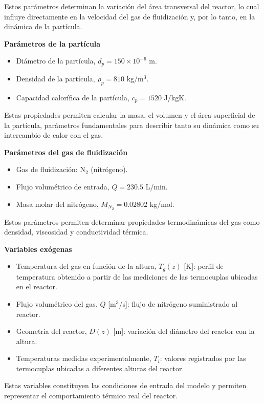 \documentclass[11pt,stdletter,orderfromtodate,sigleft,twoside]{report}
\begin{document}
Estos parámetros determinan la variación del área transversal del reactor, lo cual influye directamente en la velocidad del gas de fluidización y, por lo tanto, en la dinámica de la partícula.
\medskip


\textbf{Parámetros de la partícula}

\begin{itemize}
\item Diámetro de la partícula, $d_p = 150 \times 10^{-6}$ m.
\item Densidad de la partícula, $\rho_p = 810$ kg/m$^3$.
\item Capacidad calorífica de la partícula, $c_p = 1520$ J/kgK.
\end{itemize}

Estas propiedades permiten calcular la masa, el volumen y el área superficial de la partícula, parámetros fundamentales para describir tanto su dinámica como su intercambio de calor con el gas.
\medskip


\textbf{Parámetros del gas de fluidización}

\begin{itemize}
\item Gas de fluidización: N$_2$ (nitrógeno).
\item Flujo volumétrico de entrada, $Q = 230.5$ L/min.
\item Masa molar del nitrógeno, $M_{N_2} = 0.02802$ kg/mol.
\end{itemize}

Estos parámetros permiten determinar propiedades termodinámicas del gas como densidad, viscosidad y conductividad térmica.
\medskip


\textbf{Variables exógenas} 

\begin{itemize}
\item Temperatura del gas en función de la altura, $T_g(z)$ [K]: perfil de temperatura obtenido a partir de las mediciones de las termocuplas ubicadas en el reactor.
\item Flujo volumétrico del gas, $Q$ [m$^3$/s]: flujo de nitrógeno suministrado al reactor.
\item Geometría del reactor, $D(z)$ [m]: variación del diámetro del reactor con la altura.
\item Temperaturas medidas experimentalmente, $T_i$: valores registrados por las termocuplas ubicadas a diferentes alturas del reactor.
\end{itemize}

Estas variables constituyen las condiciones de entrada del modelo y permiten representar el comportamiento térmico real del reactor.
\medskip
\end{document}

